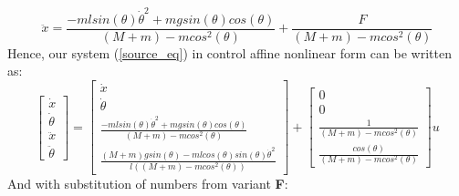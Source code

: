 \documentclass[a4paper,12pt]{article}
\begin{document}
    \begin{equation}
        \ddot x = 
        \frac
        {- mlsin(\theta)\dot \theta^2 + mgsin(\theta)cos(\theta)}
        {(M+m) - mcos^2(\theta)}
        +
        \frac
        {F}
        {(M+m) - mcos^2(\theta)}
    \end{equation}
    Hence, our system (\ref{source_eq}) in control affine nonlinear form can be
    written as:
    \begin{equation}
        \begin{bmatrix}
            \dot x\\
            \dot \theta\\
            \ddot x\\
            \ddot \theta    
        \end{bmatrix}
        =
        \begin{bmatrix}
            \dot x\\
            \dot \theta\\
            \frac
            {- mlsin(\theta)\dot \theta^2 + mgsin(\theta)cos(\theta)}
            {(M+m) - mcos^2(\theta)}\\
            \frac
            {(M+m)gsin(\theta) - mlcos(\theta)sin(\theta)\dot \theta^2}
            {l((M+m) - mcos^2(\theta))}
        \end{bmatrix}
        +
        \begin{bmatrix}
            0\\0\\
            \frac
            {1}
            {(M+m) - mcos^2(\theta)}\\
            \frac
            {cos(\theta)}
            {(M+m) - mcos^2(\theta)}
        \end{bmatrix}
        u
    \end{equation}
    And with substitution of numbers from variant \textbf{F}:
\end{document}
